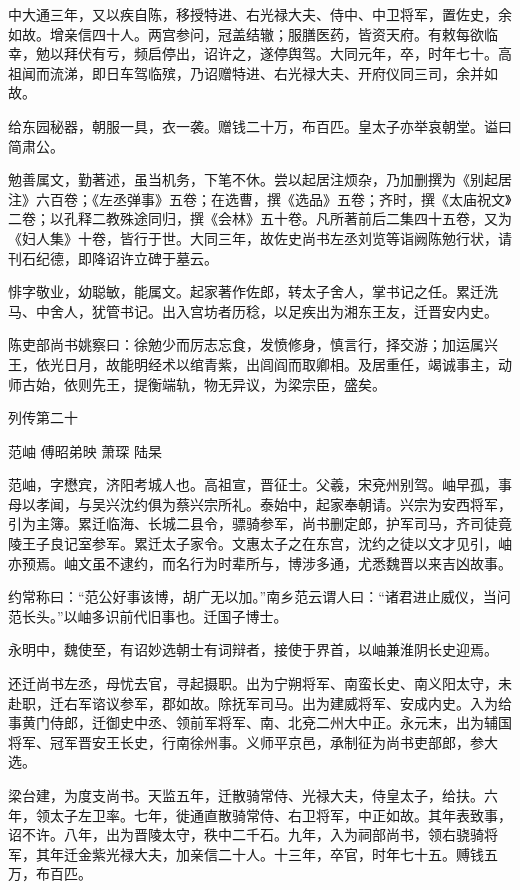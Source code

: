 \documentclass[12pt,UTF8]{ctexbook}
\begin{document}
中大通三年，又以疾自陈，移授特进、右光禄大夫、侍中、中卫将军，置佐史，余如故。增亲信四十人。两宫参问，冠盖结辙；服膳医药，皆资天府。有敕每欲临幸，勉以拜伏有亏，频启停出，诏许之，遂停舆驾。大同元年，卒，时年七十。高祖闻而流涕，即日车驾临殡，乃诏赠特进、右光禄大夫、开府仪同三司，余并如故。

给东园秘器，朝服一具，衣一袭。赠钱二十万，布百匹。皇太子亦举哀朝堂。谥曰简肃公。

勉善属文，勤著述，虽当机务，下笔不休。尝以起居注烦杂，乃加删撰为《别起居注》六百卷；《左丞弹事》五卷；在选曹，撰《选品》五卷；齐时，撰《太庙祝文》二卷；以孔释二教殊途同归，撰《会林》五十卷。凡所著前后二集四十五卷，又为《妇人集》十卷，皆行于世。大同三年，故佐史尚书左丞刘览等诣阙陈勉行状，请刊石纪德，即降诏许立碑于墓云。

悱字敬业，幼聪敏，能属文。起家著作佐郎，转太子舍人，掌书记之任。累迁洗马、中舍人，犹管书记。出入宫坊者历稔，以足疾出为湘东王友，迁晋安内史。

陈吏部尚书姚察曰：徐勉少而厉志忘食，发愤修身，慎言行，择交游；加运属兴王，依光日月，故能明经术以绾青紫，出闾阎而取卿相。及居重任，竭诚事主，动师古始，依则先王，提衡端轨，物无异议，为梁宗臣，盛矣。





列传第二十

范岫 傅昭弟映 萧琛 陆杲

范岫，字懋宾，济阳考城人也。高祖宣，晋征士。父羲，宋兗州别驾。岫早孤，事母以孝闻，与吴兴沈约俱为蔡兴宗所礼。泰始中，起家奉朝请。兴宗为安西将军，引为主簿。累迁临海、长城二县令，骠骑参军，尚书删定郎，护军司马，齐司徒竟陵王子良记室参军。累迁太子家令。文惠太子之在东宫，沈约之徒以文才见引，岫亦预焉。岫文虽不逮约，而名行为时辈所与，博涉多通，尤悉魏晋以来吉凶故事。

约常称曰：“范公好事该博，胡广无以加。”南乡范云谓人曰：“诸君进止威仪，当问范长头。”以岫多识前代旧事也。迁国子博士。

永明中，魏使至，有诏妙选朝士有词辩者，接使于界首，以岫兼淮阴长史迎焉。

还迁尚书左丞，母忧去官，寻起摄职。出为宁朔将军、南蛮长史、南义阳太守，未赴职，迁右军谘议参军，郡如故。除抚军司马。出为建威将军、安成内史。入为给事黄门侍郎，迁御史中丞、领前军将军、南、北兗二州大中正。永元末，出为辅国将军、冠军晋安王长史，行南徐州事。义师平京邑，承制征为尚书吏部郎，参大选。

梁台建，为度支尚书。天监五年，迁散骑常侍、光禄大夫，侍皇太子，给扶。六年，领太子左卫率。七年，徙通直散骑常侍、右卫将军，中正如故。其年表致事，诏不许。八年，出为晋陵太守，秩中二千石。九年，入为祠部尚书，领右骁骑将军，其年迁金紫光禄大夫，加亲信二十人。十三年，卒官，时年七十五。赙钱五万，布百匹。
\end{document}
